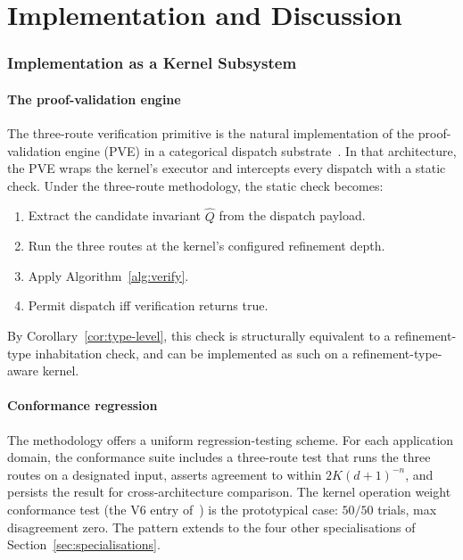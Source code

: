 \documentclass[twocolumn,11pt,a4paper]{article}
\newcommand{\Inv}{Q}
\newcommand{\Depth}{n}
\newcommand{\Dim}{d}
\newcommand{\Tolb}{K}
\begin{document}
\part{Implementation and Discussion}

\section{Implementation as a Kernel Subsystem}
\label{sec:kernel}

\subsection{The proof-validation engine}

The three-route verification primitive is the natural implementation of the proof-validation engine (PVE) in a categorical dispatch substrate~\citep{sachikonye2026integration}. In that architecture, the PVE wraps the kernel's executor and intercepts every dispatch with a static check. Under the three-route methodology, the static check becomes:
\begin{enumerate}[nosep,leftmargin=*]
\item Extract the candidate invariant $\hat\Inv$ from the dispatch payload.
\item Run the three routes at the kernel's configured refinement depth.
\item Apply Algorithm~\ref{alg:verify}.
\item Permit dispatch iff verification returns true.
\end{enumerate}
By Corollary~\ref{cor:type-level}, this check is structurally equivalent to a refinement-type inhabitation check, and can be implemented as such on a refinement-type-aware kernel.

\subsection{Conformance regression}

The methodology offers a uniform regression-testing scheme. For each application domain, the conformance suite includes a three-route test that runs the three routes on a designated input, asserts agreement to within $2\Tolb(\Dim+1)^{-\Depth}$, and persists the result for cross-architecture comparison. The kernel operation weight conformance test (the V6 entry of~\citealp{sachikonye2026coe}) is the prototypical case: $50/50$ trials, max disagreement zero. The pattern extends to the four other specialisations of Section~\ref{sec:specialisations}.
\end{document}
